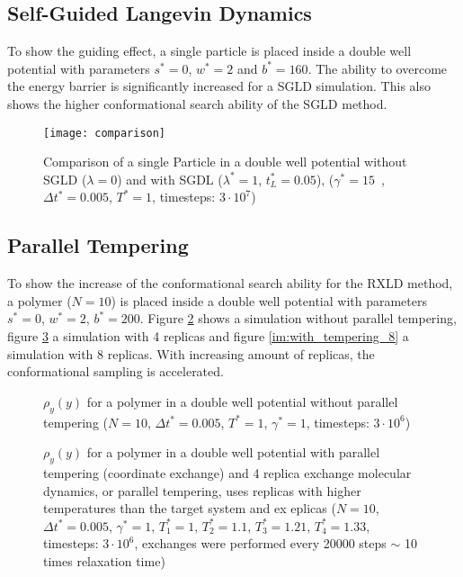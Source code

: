 \documentclass[a4paper]{article}
\begin{document}
\subsection{Self-Guided Langevin Dynamics}

To show the guiding effect, a single particle is placed inside a double well potential with parameters $s^* = 0$, $w^* = 2$ and $b^* = 160$. The ability to overcome the energy barrier is significantly increased for a SGLD simulation. This also shows the higher conformational search ability of the SGLD method.

\begin{figure} [H]
\centering
\texttt{[image: comparison]}
\caption{Comparison of a single Particle in a double well potential without SGLD ($\lambda = 0$) and with SGDL ($\lambda^* = 1$, $t_L^* = 0.05$), ($\gamma^* = 15 \enspace$, $\Delta t^* = 0.005$, $T^* = 1$, timesteps: $3 \cdot 10^7$)}
\label{im:verlet_boltzmann}
\end{figure}

\subsection{Parallel Tempering}

To show the increase of the conformational search ability for the RXLD method, a polymer ($N = 10$) is placed inside a double well potential with parameters $s^* = 0$, $w^* = 2$, $b^* = 200$. Figure \ref{im:without_tempering} shows a simulation without parallel tempering, figure \ref{im:with_tempering_4} a simulation with 4 replicas and figure \ref{im:with_tempering_8} a simulation with 8 replicas. With increasing amount of replicas, the conformational sampling is accelerated. 

\begin{figure} [H]
\centering
\scalebox{.9}{}
\caption{$\rho_y(y)$ for a polymer in a double well potential without parallel tempering ($N = 10$, $\Delta t^* = 0.005$, $T^* = 1$, $\gamma^* = 1$, timesteps: $3 \cdot 10^6$)}
\label{im:without_tempering}
\end{figure}

\begin{figure} [H]
\centering
\scalebox{.9}{}
\caption{$\rho_y(y)$ for a polymer in a double well potential with parallel tempering (coordinate exchange) and 4 replica exchange molecular dynamics, or parallel tempering, uses replicas with higher temperatures than the target system and ex
eplicas ($N = 10$, $\Delta t^* = 0.005$, $\gamma^* = 1$, $T_1^* = 1$, $T_2^* = 1.1$, $T_3^* = 1.21$, $T_4^* = 1.33$, timesteps: $3 \cdot 10^6$, exchanges were performed every 20000 steps $\sim$ 10 times relaxation time)}
\label{im:with_tempering_4}
\end{figure}
\end{document}
